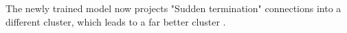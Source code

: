 \documentclass[conference]{IEEEtran}
\begin{document}
The newly trained model now projects "Sudden termination" connections into a different cluster, which leads to a far better cluster .




\end{document}
